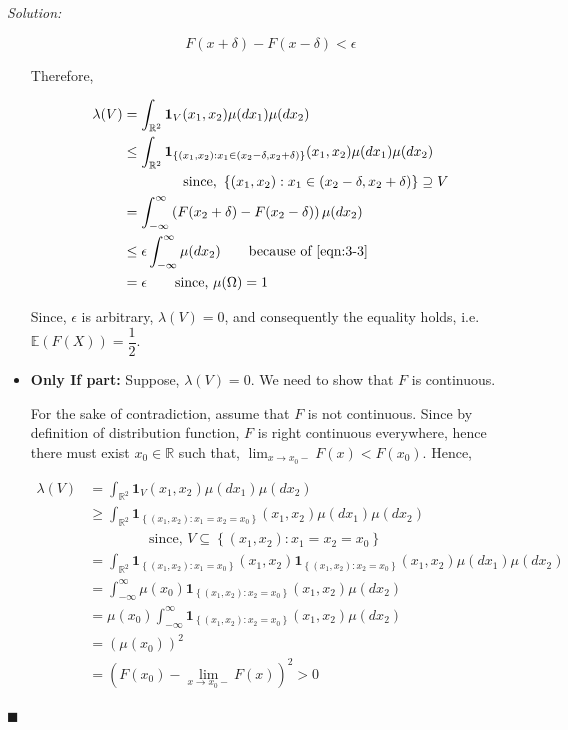 \documentclass[12pt]{article}
\newcommand{\R}{\mathbb{R}}
\newcommand{\E}{\mathbb{E}}
\theoremstyle{definition}
\newenvironment{answer}{\textit{Solution: }\quad }{ \hfill $\blacksquare$}
\begin{document}
\begin{answer}
\begin{itemize}
		\begin{equation}
			F\left( x + \delta \right) - F\left( x - \delta \right) < \epsilon
			\label{eqn:3-3}
		\end{equation}

		Therefore,

		\begin{align*}
			\lambda(V)
			& = \int_{\R^2} \bm{1}_V(x_1,x_2) \mu(dx_1) \mu(dx_2)\\
			& \leq \int_{\R^2} \bm{1}_{ \left\{ (x_1, x_2) : x_1 \in (x_2 - \delta, x_2 + \delta) \right\} }(x_1, x_2) \mu(dx_1) \mu(dx_2)\\
			& \qquad \qquad \text{ since, } \left\{ (x_1, x_2) : x_1 \in (x_2 - \delta, x_2 + \delta) \right\} \supseteq V\\
			& = \int_{-\infty}^{\infty} \left( F(x_2 + \delta) - F(x_2 - \delta) \right) \mu(dx_2)\\
			& \leq \epsilon \int_{-\infty}^{\infty} \mu(dx_2) \qquad \text{because of \cref{eqn:3-3}}\\
			& = \epsilon\qquad \text{since, } \mu(\Omega) = 1
		\end{align*}

		Since, $\epsilon$ is arbitrary, $\lambda(V) = 0$, and consequently the equality holds, i.e. $\E(F(X)) = \dfrac{1}{2}$.
		
		\item \textbf{Only If part:} Suppose, $\lambda(V) = 0$. We need to show that $F$ is continuous. 
		
		For the sake of contradiction, assume that $F$ is not continuous. Since by definition of distribution function, $F$ is right continuous everywhere, hence there must exist $x_0 \in \R$ such that, $\displaystyle\lim_{x \rightarrow x_0 -} F(x) < F(x_0)$. Hence,
		
		\begin{align*}
			\lambda(V)
			& = \int_{\R^2} \bm{1}_V(x_1, x_2) \mu(dx_1) \mu(dx_2)\\
			& \geq \int_{\R^2} \bm{1}_{ \left\{ (x_1, x_2): x_1 = x_2 = x_0 \right\} }(x_1, x_2)\mu(dx_1) \mu(dx_2)\\
			& \qquad \qquad \text{ since, } V \subseteq \left\{ (x_1, x_2): x_1 = x_2 = x_0 \right\}\\
			& = \int_{\R^2} \bm{1}_{ \left\{ (x_1, x_2): x_1 = x_0\right\} }(x_1, x_2) \bm{1}_{ \left\{ (x_1, x_2): x_2 = x_0\right\} }(x_1, x_2)\mu(dx_1) \mu(dx_2)\\
			& = \int_{-\infty}^{\infty} \mu(x_0) \bm{1}_{ \left\{ (x_1, x_2): x_2 = x_0\right\} }(x_1, x_2)\mu(dx_2)\\
			& = \mu(x_0) \int_{-\infty}^{\infty} \bm{1}_{ \left\{ (x_1, x_2): x_2 = x_0\right\} }(x_1, x_2)\mu(dx_2)\\
			& = (\mu(x_0))^2 \\
			& = \left( F(x_0) - \lim_{x \rightarrow x_0 -} F(x) \right)^2 > 0\\
		\end{align*}


\end{itemize}
\end{answer}
\end{document}
